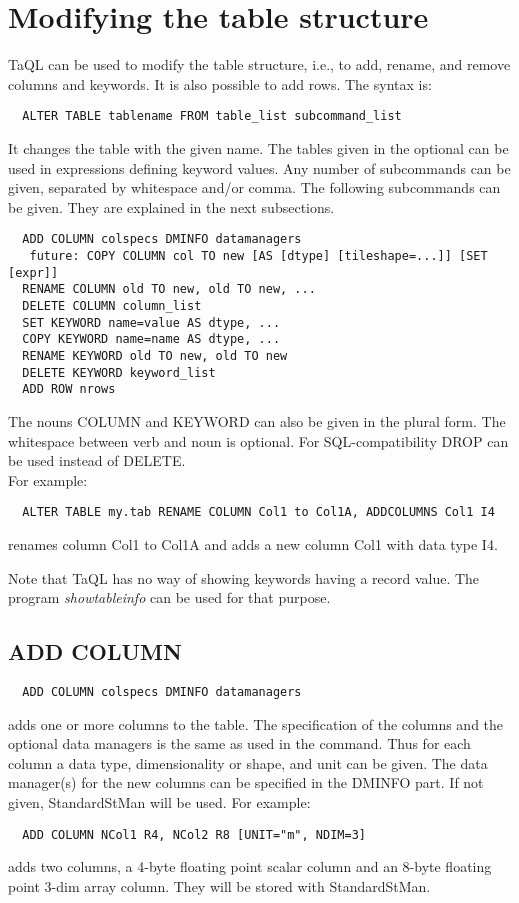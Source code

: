 \section{\label{TAQL:ALTERTABLE}Modifying the table structure}
TaQL can be used to modify the table structure, i.e., to add, rename,
and remove columns and keywords. It is also possible to add rows.
The syntax is:
\begin{verbatim}
  ALTER TABLE tablename FROM table_list subcommand_list
\end{verbatim}
It changes the table with the given name. The tables given in the 
optional 
can be used in expressions defining keyword values.
Any number of subcommands can be given, separated by whitespace and/or 
comma.
The following subcommands can be given. They are explained in
the next subsections.
\begin{verbatim}
  ADD COLUMN colspecs DMINFO datamanagers
   future: COPY COLUMN col TO new [AS [dtype] [tileshape=...]] [SET [expr]]
  RENAME COLUMN old TO new, old TO new, ...
  DELETE COLUMN column_list
  SET KEYWORD name=value AS dtype, ...
  COPY KEYWORD name=name AS dtype, ...
  RENAME KEYWORD old TO new, old TO new
  DELETE KEYWORD keyword_list
  ADD ROW nrows
\end{verbatim}
The nouns COLUMN and KEYWORD can also be given in the plural form. The
whitespace between verb and 
noun is optional. For SQL-compatibility DROP can be used instead of DELETE.
\\For example:
\begin{verbatim}
  ALTER TABLE my.tab RENAME COLUMN Col1 to Col1A, ADDCOLUMNS Col1 I4
\end{verbatim}
renames column Col1 to Col1A and adds a new column Col1 with data type I4.

Note that TaQL has no way of showing keywords having a record value.
The program {\em showtableinfo} can be used for that purpose.

\subsection{ADD COLUMN}
\begin{verbatim}
  ADD COLUMN colspecs DMINFO datamanagers
\end{verbatim}
adds one or more columns to the table.
The specification of the columns and the optional data managers is the
same as used in the
 command. Thus for each column
a data type, dimensionality or shape, and unit  can be given.
The data manager(s) for the new columns can be specified in the DMINFO
part. If not given, StandardStMan will be used.
For example:
\begin{verbatim}
  ADD COLUMN NCol1 R4, NCol2 R8 [UNIT="m", NDIM=3]
\end{verbatim}
adds two columns, a 4-byte floating point scalar column and an 8-byte
floating point 3-dim array column. They will be stored with StandardStMan.

